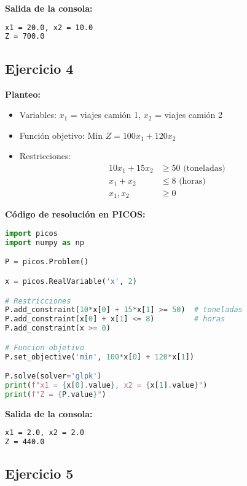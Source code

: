 \documentclass[12pt]{article}
\begin{document}
\begin{enumerate}
\textbf{Salida de la consola:}
\begin{lstlisting}[language=bash,backgroundcolor=\color{black},basicstyle=\color{white}\ttfamily,numbers=none]
x1 = 20.0, x2 = 10.0
Z = 700.0
\end{lstlisting}

\subsection*{Ejercicio 4}

\textbf{Planteo:}
\begin{itemize}
\item Variables: $x_1$ = viajes camión 1, $x_2$ = viajes camión 2
\item Función objetivo: Min $Z = 100x_1 + 120x_2$
\item Restricciones:
  \begin{align*}
  10x_1 + 15x_2 &\geq 50 \text{ (toneladas)} \\
  x_1 + x_2 &\leq 8 \text{ (horas)} \\
  x_1, x_2 &\geq 0
  \end{align*}
\end{itemize}

\textbf{Código de resolución en PICOS:}
\begin{lstlisting}[language=Python]
import picos
import numpy as np

P = picos.Problem()

x = picos.RealVariable('x', 2)

# Restricciones
P.add_constraint(10*x[0] + 15*x[1] >= 50)  # toneladas
P.add_constraint(x[0] + x[1] <= 8)         # horas
P.add_constraint(x >= 0)

# Funcion objetivo
P.set_objective('min', 100*x[0] + 120*x[1])

P.solve(solver='glpk')
print(f"x1 = {x[0].value}, x2 = {x[1].value}")
print(f"Z = {P.value}")
\end{lstlisting}

\textbf{Salida de la consola:}
\begin{lstlisting}[language=bash,backgroundcolor=\color{black},basicstyle=\color{white}\ttfamily,numbers=none]
x1 = 2.0, x2 = 2.0
Z = 440.0
\end{lstlisting}

\subsection*{Ejercicio 5}


\end{enumerate}
\end{document}
